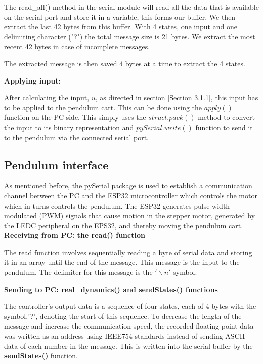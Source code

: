 The read\_all() method in the serial module will read all the data that is available on the serial port and store it in a variable, this forms our buffer. We then extract the last 42 bytes from this buffer. With 4 states, one input and one delimiting character ("?") the total message size is 21 bytes. We extract the most recent 42 bytes in case of incomplete messages. 

The extracted message is then saved 4 bytes at a time to extract the 4 states. 


\textbf{Applying input:}

After calculating the input, $u$, as directed in section \ref{Section 3.1.1}, this input has to be applied to the pendulum cart. This can be done using the $apply()$ function on the PC side. This simply uses the $struct.pack()$ method to convert the input to its binary representation and $pySerial.write()$ function to send it to the pendulum via the connected serial port. 

\subsection{Pendulum interface}

As mentioned before, the pySerial package is used to establish a communication channel between the PC and the ESP32 microcontroller which controls the motor which in turns controls the pendulum. The ESP32 generates pulse width modulated (PWM) signals that cause motion in the stepper motor, generated by the LEDC peripheral on the EPS32, and thereby moving the pendulum cart.  \\


\textbf{Receiving from PC: the read() function}

The read function involves sequentially reading a byte of serial data and storing it in an array until the end of the message. This message is the input to the pendulum. The delimiter for this message is the $'\backslash n'$ symbol. 

\textbf{Sending to PC: real\_dynamics() and sendStates() functions}

The controller's output data is a sequence of four states, each of 4 bytes with the symbol,'?', denoting the start of this sequence.  To decrease the length of the message and increase the communication speed, the recorded floating point data was written as an address using IEEE754 standards instead of sending ASCII data of each number in the message. This is written into the serial buffer by the \textbf{sendStates()} function.

